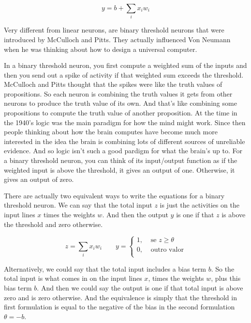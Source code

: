 \begin{multicols}{2}
\begin{footnotesize}
\begin{equation}
y = b + \sum_i x_i w_i
\label{eq:linear-neuron}
\end{equation}

Very different from linear neurons, are binary threshold neurons that were introduced by McCulloch and Pitts. They actually influenced Von Neumann when he was thinking about how to design a universal computer.

In a binary threshold neuron, you first compute a weighted sum of the inputs and then you send out a spike of activity if that weighted sum exceeds the threshold. McCulloch and Pitts thought that the spikes were like the truth values of propositions. So each neuron is combining the truth values it gets from other neurons to produce the truth value of its own. And that's like combining some propositions to compute the truth value of another proposition. At the time in the 1940's logic was the main paradigm for how the mind might work. Since then people thinking about how the brain computes have become much more interested in the idea the brain is combining lots of different sources of unreliable evidence. And so logic isn't such a good pardigm for what the brain's up to. For a binary threshold neuron, you can think of its input\slash output function as if the weighted input is above the threshold, it gives an output of one. Otherwise, it gives an output of zero.

There are actually two equivalent ways to write the equations for a binary threshold neuron. We can say that the total input $z$ is just the activities on the input lines $x$ times the weights $w$. And then the output $y$ is one if that $z$ is above the threshold and zero otherwise.

\begin{equation}
z = \sum_i x_i w_i
\qquad
y = \left\{
    \begin{array}{ll}
    1, & \mbox{ se } z\geq\theta \\
    0, & \mbox{ outro valor} \\
    \end{array}
    \right.
\label{eq:binary-threshold-formulation1}
\end{equation}

Alternatively, we could say that the total input includes a bias term $b$. So the total input is what comes in on the input lines $x$, times the weights $w$, plus this bias term $b$. And then we could say the output is one if that total input is above zero and is zero otherwise. And the equivalence is simply that the threshold in first formulation is equal to the negative of the bias in the second formulation $\theta = -b$.


\end{footnotesize}
\end{multicols}
